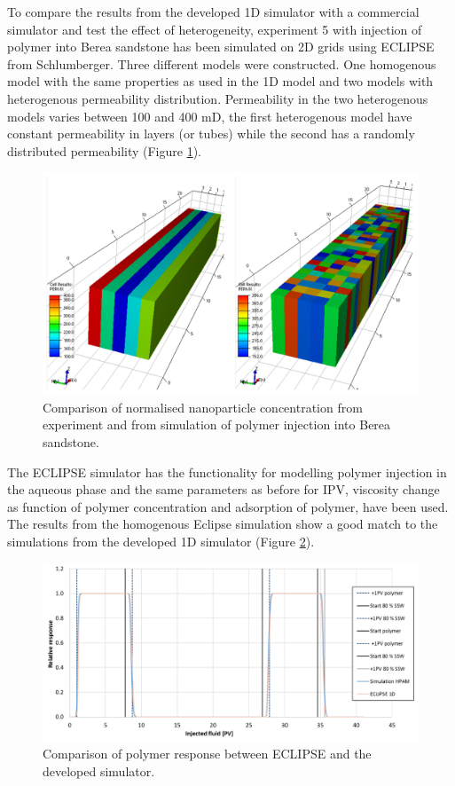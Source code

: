 \documentclass[journal = enfuem, manuscript =  article]{achemso}
\begin{document}
To compare the results from the developed 1D simulator with a commercial simulator and test the effect of heterogeneity, experiment 5 with injection of polymer into Berea sandstone has been simulated on 2D grids using ECLIPSE from Schlumberger. Three different models were constructed. One homogenous model with the same properties as used in the 1D model and two models with heterogenous permeability distribution. Permeability in the two heterogenous models varies between 100 and 400 mD, the first heterogenous model have constant permeability in layers (or tubes) while the second has a randomly distributed permeability (Figure \ref{cht:sim2dPerm}). 

\begin{figure}[h]
    \centering
    \includegraphics[width=\textwidth]{fig/sim2dPerm.png}
    \caption{Comparison of normalised nanoparticle concentration from experiment and from simulation of polymer injection into Berea sandstone.}
    \label{cht:sim2dPerm}
\end{figure}

\enlargethispage{2cm} %
The ECLIPSE simulator has the functionality for modelling polymer injection in the aqueous phase and the same parameters as before for IPV, viscosity change as function of polymer concentration and adsorption of polymer, have been used. The results from the homogenous Eclipse simulation show a good match to the simulations from the developed 1D simulator (Figure \ref{cht:simEcl}).

\begin{figure}
    \centering
    \includegraphics[width=\textwidth]{fig/simEcl.png}
    \caption{Comparison of polymer response between ECLIPSE and the developed simulator.}
    \label{cht:simEcl}
\end{figure}
\end{document}
